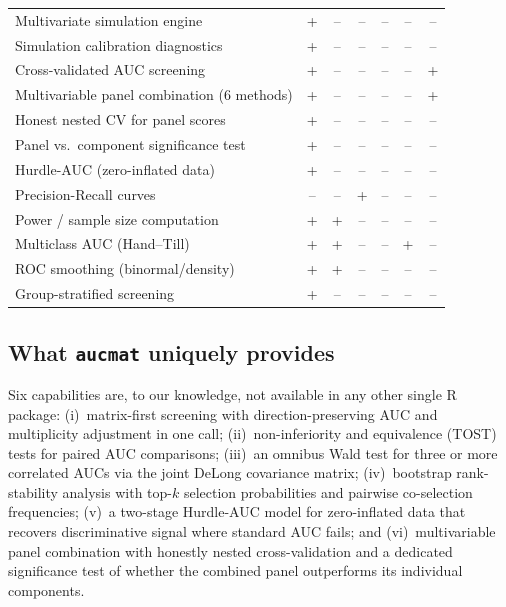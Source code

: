 \documentclass[11pt,a4paper]{article}
\begin{document}
\begin{table}[htbp]
\begin{tabular}{@{}p{6.5cm}cccccc@{}}
Multivariate simulation engine                      & + & -- & -- & -- & -- & -- \\
Simulation calibration diagnostics                  & + & -- & -- & -- & -- & -- \\
Cross-validated AUC screening                       & + & -- & -- & -- & -- & + \\
Multivariable panel combination (6 methods)         & + & -- & -- & -- & -- & + \\
Honest nested CV for panel scores                   & + & -- & -- & -- & -- & -- \\
Panel vs.\ component significance test              & + & -- & -- & -- & -- & -- \\
Hurdle-AUC (zero-inflated data)                     & + & -- & -- & -- & -- & -- \\
Precision-Recall curves                             & -- & -- & +  & -- & -- & -- \\
Power / sample size computation                     & + & +  & -- & -- & -- & -- \\
Multiclass AUC (Hand--Till)                         & + & +  & -- & -- & + & -- \\
ROC smoothing (binormal/density)                    & + & +  & -- & -- & -- & -- \\
Group-stratified screening                          & + & -- & -- & -- & -- & -- \\
\bottomrule
\end{tabular}
\end{table}

\subsection{What \texttt{aucmat} uniquely provides}

Six capabilities are, to our knowledge, not available in any other single R
package: (i)~matrix-first screening with direction-preserving AUC and
multiplicity adjustment in one call; (ii)~non-inferiority and equivalence
(TOST) tests for paired AUC comparisons; (iii)~an omnibus Wald test for
three or more correlated AUCs via the joint DeLong covariance matrix;
(iv)~bootstrap rank-stability analysis with top-$k$ selection probabilities
and pairwise co-selection frequencies; (v)~a two-stage Hurdle-AUC model for
zero-inflated data that recovers discriminative signal where standard AUC
fails; and (vi)~multivariable panel combination with honestly nested
cross-validation and a dedicated significance test of whether the combined
panel outperforms its individual components.
\end{document}
